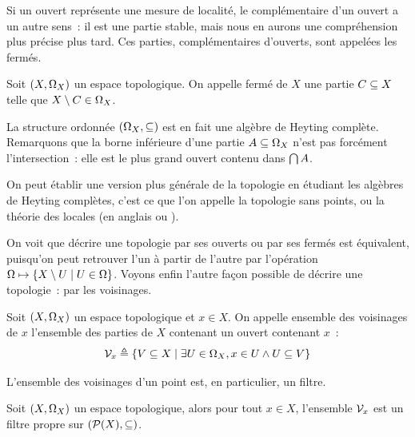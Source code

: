 Si un ouvert représente une mesure de localité, le complémentaire d'un ouvert a
un autre sens~: il est une partie stable, mais nous en aurons une compréhension
plus précise plus tard. Ces parties, complémentaires d'ouverts, sont appelées
les fermés.

\begin{definition}[Fermé]
  Soit $(X,\Omega_{X})$ un espace topologique. On appelle fermé de $X$ une partie
  $C\subseteq X$ telle que $X\setminus C \in \Omega_{X}$.
\end{definition}

\begin{remark}
  La structure ordonnée $(\Omega_{X},\subseteq)$ est en fait une algèbre de
  Heyting complète. Remarquons que la borne inférieure d'une partie
  $A\subseteq\Omega_{X}$ n'est pas forcément l'intersection~: elle est le
  plus grand ouvert contenu dans $\bigcap A$.

  On peut établir une version plus générale de la topologie en étudiant les
  algèbres de Heyting complètes, c'est ce que l'on appelle la topologie
  sans points, ou la théorie des locales
  (en anglais  ou
  ).
\end{remark}

On voit que décrire une topologie par ses ouverts ou par ses fermés est
équivalent, puisqu'on peut retrouver l'un à partir de l'autre par l'opération
$\Omega \mapsto \left\{ X\setminus U \;\middle\vert\; U \in \Omega \right\}$. Voyons enfin
l'autre façon possible de décrire une topologie~: par les voisinages.

\begin{definition}[Voisinage]
  Soit $(X,\Omega_{X})$ un espace topologique et $x\in X$. On appelle ensemble
  des voisinages de $x$ l'ensemble des parties de $X$ contenant un ouvert
  contenant $x$~:
  \[\mathcal{V}_{x} \triangleq \left\{ V \subseteq X \;\middle\vert\; \exists U \in \Omega_{X},
    x\in U \land U\subseteq V \right\}\]
\end{definition}

\noindent
L'ensemble des voisinages d'un point est, en particulier, un filtre.

\begin{property}
  Soit $(X,\Omega_{X})$ un espace topologique, alors pour tout $x\in X$,
  l'ensemble $\mathcal{V}_{x}$ est un filtre propre sur $(\mathcal{P}(X),\subseteq)$.
\end{property}


